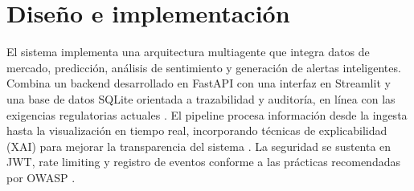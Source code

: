 \chapter{Diseño e implementación} %

\label{Chapter3} %

El sistema implementa una arquitectura multiagente \parencite{wooldridge2009intelligent} que integra datos de mercado, predicción, análisis de sentimiento y generación de alertas inteligentes. Combina un backend desarrollado en FastAPI \parencite{grinberg2018flask} con una interfaz en Streamlit y una base de datos SQLite orientada a trazabilidad y auditoría, en línea con las exigencias regulatorias actuales \parencite{bcra7724}. El pipeline procesa información desde la ingesta hasta la visualización en tiempo real, incorporando técnicas de explicabilidad (XAI) para mejorar la transparencia del sistema \parencite{arrieta2020explainable}. La seguridad se sustenta en JWT, rate limiting y registro de eventos conforme a las prácticas recomendadas por OWASP \parencite{owasp2021}.


